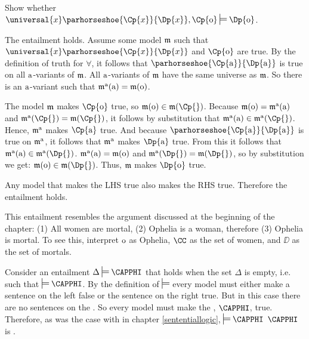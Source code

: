 \begin{majorILnc}{}
	Show whether $\universal{\variable{x}}\parhorseshoe{\Cp{\variable{x}}}{\Dp{\variable{x}}}, \Cp{\constant{o}}\sdtstile{}{}\Dp{\constant{o}}$.
\end{majorILnc}
\begin{PROOF}
	The entailment holds.
	Assume some model $\mathfrak{m}$ such that $\universal{\variable{x}}\parhorseshoe{\Cp{\variable{x}}}{\Dp{\variable{x}}}$ and $\Cp{\constant{o}}$ are true.
	By the definition of truth for $\forall$, it follows that $\parhorseshoe{\Cp{\constant{a}}}{\Dp{\constant{a}}}$ is true on all $\mathrm{a}$-variants of $\mathfrak{m}$.
	All $\mathrm{a}$-variants of $\mathfrak{m}$ have the same universe as $\mathfrak{m}$.
	So there is an $\mathrm{a}$-variant such that $\mathfrak{m^{\mathrm{\mathrm{a}}}_{\mathrm{}}}(\mathrm{a})=\mathfrak{m}(\mathrm{o})$.
	
	The model $\mathfrak{m}$ makes $\Cp{\constant{o}}$ true, so $\IntA(\constant{o})\in\IntA(\Cp{})$.
	Because $\mathfrak{m}(\mathrm{o})=\mathfrak{m^{\mathrm{\mathrm{a}}}_{\mathrm{}}}(\mathrm{a})$ and $\As{\constant{a}}{}(\Cp{})=\IntA(\Cp{})$, it follows by substitution that $\As{\constant{a}}{}(\constant{a})\in\As{\constant{a}}{}(\Cp{})$.
	Hence, $\mathfrak{m^{\mathrm{\mathrm{a}}}_{\mathrm{}}}$ makes $\Cp{\constant{a}}$ true.
	And because $\parhorseshoe{\Cp{\constant{a}}}{\Dp{\constant{a}}}$ is true on $\mathfrak{m^{\mathrm{\mathrm{a}}}_{\mathrm{}}}$, it follows that $\mathfrak{m^{\mathrm{\mathrm{a}}}_{\mathrm{}}}$ makes $\Dp{\constant{a}}$ true.
	From this it follows that $\As{\constant{a}}{}(\constant{a})\in\As{\constant{a}}{}(\Dp{})$.  $\mathfrak{m^{\mathrm{\mathrm{a}}}_{\mathrm{}}}(\mathrm{a})=\mathfrak{m}(\mathrm{o})$ and $\As{\constant{a}}{}(\Dp{})=\IntA(\Dp{})$, so by substitution we get: $\IntA(\constant{o})\in\IntA(\Dp{})$.
	Thus, $\mathfrak{m}$ makes $\Dp{\constant{o}}$ true.

	Any model that makes the LHS true also makes the RHS true.  Therefore the entailment holds.
\end{PROOF}	
\begin{commentary}
	This entailment resembles the argument discussed at the beginning of the chapter: (1) All women are mortal, (2) Ophelia is a woman, therefore (3) Ophelia is mortal.
	To see this, interpret $\mathrm{o}$ as Ophelia, $\CC$ as the set of women, and $\DD$ as the set of mortals.
\end{commentary}

Consider an entailment $\Delta\sdtstile{}{}\CAPPHI$ that holds when the set $\Delta$ is empty, i.e. such that $\sdtstile{}{}\CAPPHI$.
By the definition of $\sdtstile{}{}$ every model must either make a sentence on the left false or the sentence on the right true.
But in this case there are no sentences on the .
So every model must make the , $\CAPPHI$, true.
Therefore, as was the case with \GSL{} in chapter \ref{sententiallogic}, $\sdtstile{}{}\CAPPHI$ \Iff $\CAPPHI$ is .

